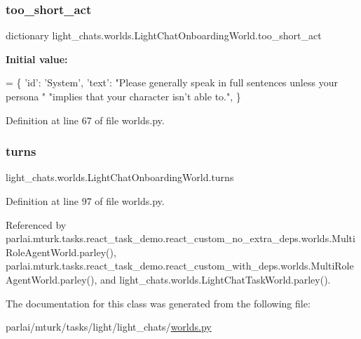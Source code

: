 \subsubsection{\texorpdfstring{too\+\_\+short\+\_\+act}{too\_short\_act}}
{\footnotesize\ttfamily dictionary light\+\_\+chats.\+worlds.\+Light\+Chat\+Onboarding\+World.\+too\+\_\+short\+\_\+act\hspace{0.3cm}{\ttfamily [static]}}

{\bfseries Initial value\+:}
\begin{DoxyCode}
=  \{
        \textcolor{stringliteral}{'id'}: \textcolor{stringliteral}{'System'},
        \textcolor{stringliteral}{'text'}: \textcolor{stringliteral}{"Please generally speak in full sentences unless your persona "}
        \textcolor{stringliteral}{"implies that your character isn't able to."},
    \}
\end{DoxyCode}


Definition at line 67 of file worlds.\+py.

\mbox{\label{classlight__chats_1_1worlds_1_1LightChatOnboardingWorld_a25ce483673ea7734de9f659a3b960c2b}} 
\subsubsection{\texorpdfstring{turns}{turns}}
{\footnotesize\ttfamily light\+\_\+chats.\+worlds.\+Light\+Chat\+Onboarding\+World.\+turns}



Definition at line 97 of file worlds.\+py.



Referenced by parlai.\+mturk.\+tasks.\+react\+\_\+task\+\_\+demo.\+react\+\_\+custom\+\_\+no\+\_\+extra\+\_\+deps.\+worlds.\+Multi\+Role\+Agent\+World.\+parley(), parlai.\+mturk.\+tasks.\+react\+\_\+task\+\_\+demo.\+react\+\_\+custom\+\_\+with\+\_\+deps.\+worlds.\+Multi\+Role\+Agent\+World.\+parley(), and light\+\_\+chats.\+worlds.\+Light\+Chat\+Task\+World.\+parley().



The documentation for this class was generated from the following file\+:\begin{DoxyCompactItemize}
\item 
parlai/mturk/tasks/light/light\+\_\+chats/\hyperlink{parlai_2mturk_2tasks_2light_2light__chats_2worlds_8py}{worlds.\+py}\end{DoxyCompactItemize}
